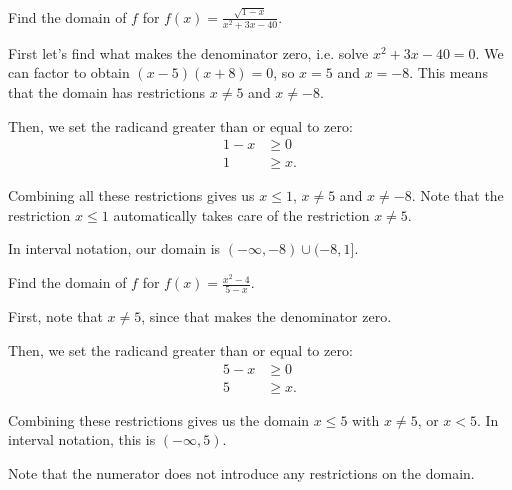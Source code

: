 \documentclass{ximera}
\begin{document}
\begin{example}
Find the domain of $f$ for $f(x) = \frac{\sqrt{1-x}}{x^2 + 3x - 40}$.
		\begin{explanation}
			\begin{expandable}
First let's find what makes the denominator zero, i.e. solve $x^2 + 3x - 40 = 0$. We can factor to obtain $(x - 5)(x + 8) = 0$, so $x = 5$ and $x = -8$. This means that the domain has restrictions $x \ne 5$ and $x \ne -8$. 

Then, we set the radicand greater than or equal to zero: \begin{align*}1 - x&\ge 0 \\ 1 & \ge x. \end{align*}

Combining all these restrictions gives us $x \le 1$, $x \ne 5$ and $x \ne -8$. Note that the restriction $x \le 1$ automatically takes care of the restriction $x \ne 5$. 

In interval notation, our domain is $(- \infty, -8) \cup (-8, 1]$. 
			\end{expandable}
		\end{explanation}
\end{example}
\begin{example}
Find the domain of $f$ for $f(x) = \frac{x^2 - 4}{5 - x}$.
		\begin{explanation}
			\begin{expandable}
First, note that $x \ne 5$, since that makes the denominator zero.

Then, we set the radicand greater than or equal to zero: \begin{align*}5 - x&\ge 0 \\ 5 & \ge x. \end{align*}

Combining these restrictions gives us the domain $x \le 5$ with $x \ne 5$, or $x < 5$. In interval notation, this is $(-\infty, 5)$.

Note that the numerator does not introduce any restrictions on the domain. 
			\end{expandable}
		\end{explanation}
\end{example}
\end{document}

